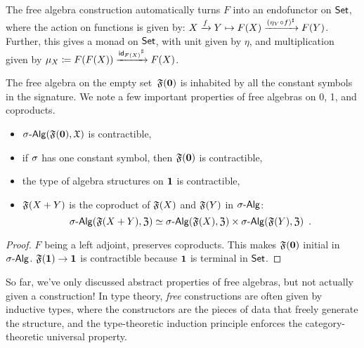 \begin{toappendix}
    The free algebra construction automatically turns $F$ into an endofunctor on $\mathsf{Set}$,
    where the action on functions is given by:
    $X \xrightarrow{f} Y \mapsto F(X) \xrightarrow{{(\eta_{Y} \mathrel{\circ} f)}^{\sharp}} F(Y)$.
    Further, this gives a monad on $\mathsf{Set}$, with unit given by $\eta$,
    and multiplication given by $\mu_{X} \mathrel{\coloneq} F(F(X)) \xrightarrow{{\operatorname{\mathsf{id}}_{F(X)}}^{\sharp}} F(X)$.

    The free algebra on the empty set~\(\mathfrak{F}({\mathbf{0}})\) is inhabited by all the constant symbols in the signature.
    We note a few important properties of free algebras on 0, 1, and coproducts.
    \begin{proposition}
        \label{prop:free-algebra-colimits}
        \leavevmode
        \begin{itemize}
            \item $\sigAlg(\str{F}(\emptyt), \str{X})$ is contractible,
            \item if $\sigma$ has one constant symbol, then $\mathfrak{F}({\mathbf{0}})$ is contractible,
            \item the type of algebra structures on ${\mathbf{1}}$ is contractible,
            \item $\mathfrak{F}(X + Y)$ is the coproduct of $\mathfrak{F}(X)$ and $\mathfrak{F}(Y)$ in $\sigAlg$:
                  \[
                      \sigAlg(\str{F}(X + Y), \str{Z}) \eqv
                      \sigAlg(\str{F}(X), \str{Z}) \times \sigAlg(\str{F}(Y), \str{Z})
                      \enspace.
                  \]
        \end{itemize}
    \end{proposition}
    \begin{proof}
        $F$ being a left adjoint, preserves coproducts.
        This makes $\mathfrak{F}({\mathbf{0}})$ initial in $\sigAlg$.
        $\mathfrak{F}({\mathbf{1}}) \to {\mathbf{1}}$ is contractible because ${\mathbf{1}}$ is terminal in $\mathsf{Set}$.
    \end{proof}
\end{toappendix}
So far, we've only discussed abstract properties of free algebras, but not actually given a construction!
%
In type theory, \emph{free} constructions are often given by inductive types,
where the constructors are the pieces of data that freely generate the structure,
and the type-theoretic induction principle enforces the category-theoretic universal property.

